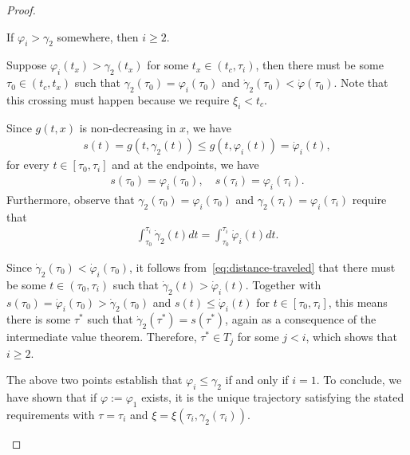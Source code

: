 \documentclass[a4paper]{article}
\theoremstyle{definition}
\theoremstyle{plain}
\begin{document}
\begin{proof}
\begin{outline}
  \1 If $\varphi_{i} > \gamma_{2}$ somewhere, then $i \geq 2$.

  \2 Suppose $\varphi_{i}(t_{x}) > \gamma_{2}(t_{x})$ for some
  $t_{x} \in (t_{c}, \tau_{i})$, then there must be some
  $\tau_{0} \in (t_{c}, t_{x})$ such that
  $\gamma_{2}(\tau_{0}) = \varphi_{i}(\tau_{0})$ and
  $\dot{\gamma}_{2}(\tau_{0}) < \dot{\varphi}(\tau_{0})$. Note that this
  crossing must happen because we require $\xi_{i} < t_{c}$.

  \2 Since $g(t, x)$ is non-decreasing in $x$, we have
  \begin{align}
    s(t) = g(t, \gamma_{2}(t)) \leq g(t, \varphi_{i}(t)) = \dot{\varphi}_{i}(t) ,
  \end{align}
  for every $t \in [\tau_{0}, \tau_{i}]$ and at the endpoints, we have
  \begin{align}
    s(\tau_{0}) = \varphi_{i}(\tau_{0}), \quad s(\tau_{i}) = \varphi_{i}(\tau_{i}) .
  \end{align}
  Furthermore, observe that $\gamma_{2}(\tau_{0}) = \varphi_{i}(\tau_{0})$ and
  $\gamma_{2}(\tau_{i}) = \varphi_{i}(\tau_{i})$ require that
  \begin{align}\label{eq:distance-traveled}
    \int_{\tau_{0}}^{\tau_{i}} \dot{\gamma}_{2}(t) dt  = \int_{\tau_{0}}^{\tau_{i}} \dot{\varphi}_{i}(t) dt .
  \end{align}

  \2 Since $\dot{\gamma}_{2}(\tau_{0}) < \dot{\varphi}_{i}(\tau_{0})$, it follows
  from~\eqref{eq:distance-traveled} that there must be some $t \in (\tau_{0}, \tau_{i})$
  such that $\dot{\gamma}_{2}(t) > \dot{\varphi}_{i}(t)$.
  Together with $s(\tau_{0}) = \dot{\varphi}_{i}(\tau_{0}) > \dot{\gamma}_{2}(\tau_{0})$
  and $s(t) \leq \dot{\varphi}_{i}(t)$ for $t \in [\tau_{0}, \tau_{i}]$, this means there is some $\tau^{*}$ such
  that $\dot{\gamma}_{2}(\tau^{*}) = s(\tau^{*})$, again as a consequence of the
  intermediate value theorem. Therefore, $\tau^{*} \in T_{j}$ for some $j < i$, which
  shows that $i \geq 2$.


  \1 The above two points establish that $\varphi_{i} \leq \gamma_{2}$ if and only if $i=1$.
  To conclude, we have shown that if $\varphi := \varphi_{1}$ exists, it is the unique
  trajectory satisfying the stated requirements with $\tau = \tau_{i}$ and
  $\xi = \xi(\tau_{i}, \gamma_{2}(\tau_{i}))$. \qedhere
\end{outline}
\end{proof}
\end{document}
